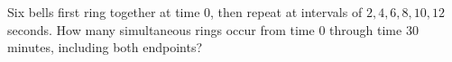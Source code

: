 Six bells first ring together at time $0$, then repeat at intervals of $2,4,6,8,10,12$ seconds. How many simultaneous rings occur from time $0$ through time $30$ minutes, including both endpoints?
